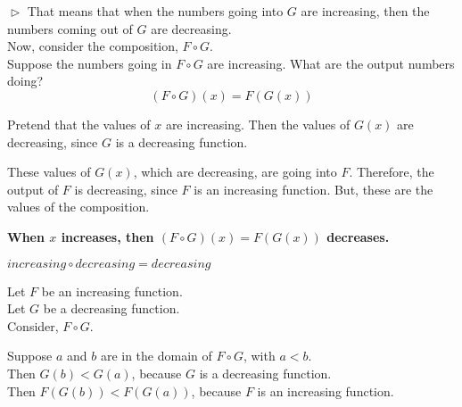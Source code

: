 \documentclass{ximera}
\begin{document}
$\vartriangleright$ That means that when the numbers going into $G$ are increasing, then the numbers coming out of $G$ are decreasing. \\



Now, consider the composition, $F \circ G$. \\


Suppose the numbers going in $F \circ G$ are increasing.  What are the output numbers doing? \\




\[ (F \circ G)(x) = F(G(x)) \]


Pretend that the values of $x$ are increasing. Then the values of $G(x)$ are decreasing, since $G$ is a decreasing function.

These values of $G(x)$, which are decreasing, are going into $F$.  Therefore, the output of $F$ is decreasing, since $F$ is an increasing function.  But, these are the values of the composition.


\begin{center}
\textbf{\textcolor{red!70!black}{When $x$ increases, then $(F \circ G)(x) = F(G(x))$ decreases.}}
\end{center}



\begin{fact}
$increasing \circ decreasing = decreasing$


Let $F$ be an increasing function. \\
Let $G$ be a decreasing function. \\


Consider, $F \circ G$.

Suppose $a$ and $b$ are in the domain of $F \circ G$, with $a < b$. \\

Then $G(b) < G(a)$, because $G$ is a decreasing function. \\

Then $F(G(b)) < F(G(a))$, because $F$ is an increasing function.


\end{fact}
\end{document}
